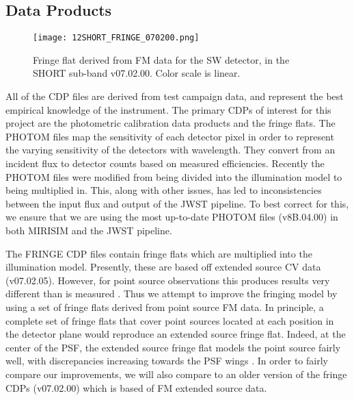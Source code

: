 \subsection{Data Products}
\begin{wrapfigure}{r}{5.5cm}
	\texttt{[image: 12SHORT\_FRINGE\_070200.png]}
	\caption{Fringe flat derived from FM data for the SW detector, in the SHORT sub-band v07.02.00. Color scale is linear.}
	\label{fig:fringeflat}
\end{wrapfigure}
All of the CDP files are derived from test campaign data, and represent the best empirical knowledge of the instrument.
The primary CDPs of interest for this project are the photometric calibration data products and the fringe flats.
The PHOTOM files map the sensitivity of each detector pixel in order to represent the varying sensitivity of the detectors with wavelength. 
They convert from an incident flux to detector counts based on measured efficiencies.
Recently the PHOTOM files were modified from being divided into the illumination model to being multiplied in. 
This, along with other issues, has led to inconsistencies between the input flux and output of the JWST pipeline.
To best correct for this, we ensure that we are using the most up-to-date PHOTOM files (v8B.04.00) in both MIRISIM and the JWST pipeline.

The FRINGE CDP files contain fringe flats which are multiplied into the illumination model. 
Presently, these are based off extended source CV data (v07.02.05).
However, for point source observations this produces results very different than is measured \parencite{Argyriou2018a}.
Thus we attempt to improve the fringing model by using a set of fringe flats derived from point source FM data. 
In principle, a complete set of fringe flats that cover point sources located at each position in the detector plane would reproduce an extended source fringe flat.
Indeed, at the center of the PSF, the extended source fringe flat models the point source fairly well, with discrepancies increasing towards the PSF wings \parencite{Argyriou2020}.
In order to fairly compare our improvements, we will also compare to an older version of the fringe CDPs (v07.02.00) which is based of FM extended source data.


